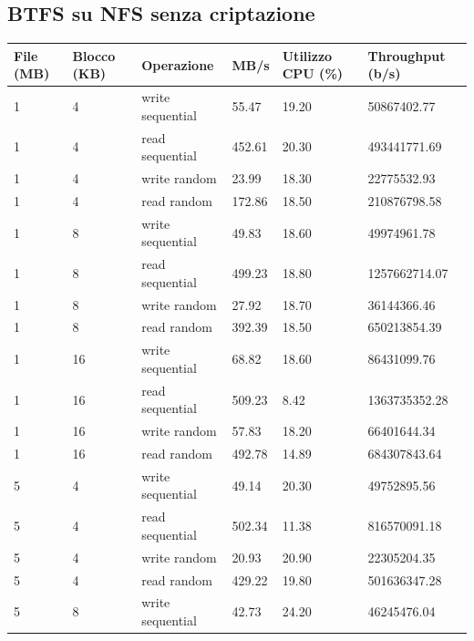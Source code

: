 \subsection{BTFS su NFS senza criptazione}
\begin{tabularx}{\textwidth}{|X|X|X|X|X|X|}
    \hline
    \textbf{File (MB)} & \textbf{Blocco (KB)} & \textbf{Operazione} & \textbf{MB/s} & \textbf{Utilizzo CPU (\%)} & \textbf{Throughput (b/s)} \\
    \hline
    \endhead
    \rowcolor{lightgray} 1 & 4 & write sequential & 55.47 & 19.20 & 50867402.77 \\
    \hline
    \rowcolor{lightgray} 1 & 4 & read sequential & 452.61 & 20.30 & 493441771.69 \\
    \hline
    \rowcolor{lightgray} 1 & 4 & write random & 23.99 & 18.30 & 22775532.93 \\
    \hline
    \rowcolor{lightgray} 1 & 4 & read random & 172.86 & 18.50 & 210876798.58 \\
    \hline
    \hline
    1 & 8 & write sequential & 49.83 & 18.60 & 49974961.78 \\
    \hline
    1 & 8 & read sequential & 499.23 & 18.80 & 1257662714.07 \\
    \hline
    1 & 8 & write random & 27.92 & 18.70 & 36144366.46 \\
    \hline
    1 & 8 & read random & 392.39 & 18.50 & 650213854.39 \\
    \hline
    \hline
    \rowcolor{lightgray} 1 & 16 & write sequential & 68.82 & 18.60 & 86431099.76 \\
    \hline
    \rowcolor{lightgray} 1 & 16 & read sequential & 509.23 & 8.42 & 1363735352.28 \\
    \hline
    \rowcolor{lightgray} 1 & 16 & write random & 57.83 & 18.20 & 66401644.34 \\
    \hline
    \rowcolor{lightgray} 1 & 16 & read random & 492.78 & 14.89 & 684307843.64 \\
    \hline
    \hline
    5 & 4 & write sequential & 49.14  & 20.30 & 49752895.56 \\
    \hline
    5 & 4 & read sequential & 502.34 & 11.38 & 816570091.18 \\
    \hline
    5 & 4 & write random & 20.93 & 20.90 & 22305204.35 \\
    \hline
    5 & 4 & read random & 429.22 & 19.80 & 501636347.28 \\
    \hline
    \hline
    \rowcolor{lightgray} 5 & 8 & write sequential & 42.73 & 24.20 & 46245476.04 \\

\end{tabularx}
